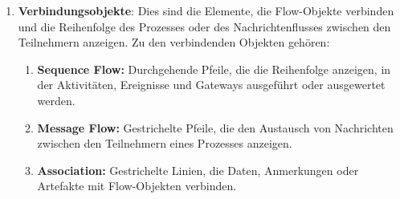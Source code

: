 \begin{enumerate}[label=\arabic*., leftmargin=*]
    \item \textbf{Verbindungsobjekte}: Dies sind die Elemente, die Flow-Objekte verbinden und die Reihenfolge des Prozesses oder des Nachrichtenflusses zwischen den Teilnehmern anzeigen. Zu den verbindenden Objekten gehören:
    \begin{enumerate}
        \item[] \begin{minipage}{\linewidth}
            \textbf{Sequence Flow:} Durchgehende Pfeile, die die Reihenfolge anzeigen, in der Aktivitäten, Ereignisse und Gateways ausgeführt oder ausgewertet werden.
            \begin{center}
            \end{center}
        \end{minipage}

        \item[] \begin{minipage}{\linewidth}
            \textbf{Message Flow:} Gestrichelte Pfeile, die den Austausch von Nachrichten zwischen den Teilnehmern eines Prozesses anzeigen.
            \begin{center}
                \end{center}
            \end{minipage}
        
        \item[] \begin{minipage}{\linewidth}
            \textbf{Association:} Gestrichelte Linien, die Daten, Anmerkungen oder Artefakte mit Flow-Objekten verbinden.
            \begin{center}
            \end{center}
        \end{minipage}
    \end{enumerate}


\end{enumerate}
